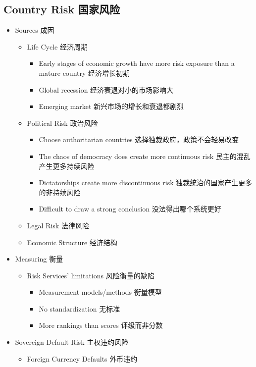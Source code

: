 \documentclass[a4paper,6pt,twoside,openany]{article}
\begin{document}
\subsection{Country Risk 国家风险}
\begin{itemize}
\item Sources 成因
  \begin{itemize}
  \item Life Cycle 经济周期
    \begin{itemize}
    \item Early stages of economic growth have more risk exposure than a mature country 经济增长初期
    \item Global recession 经济衰退对小的市场影响大
    \item Emerging market 新兴市场的增长和衰退都剧烈
    \end{itemize}
  \item Political Risk 政治风险
    \begin{itemize}
    \item Choose authoritarian countries 选择独裁政府，政策不会轻易改变
    \item The chaos of democracy does create more continuous risk 民主的混乱产生更多持续风险
    \item Dictatorships create more discontinuous risk 独裁统治的国家产生更多的非持续风险
      \item Difficult to draw a strong conclusion 没法得出哪个系统更好
    \end{itemize}
  \item Legal Risk 法律风险
  \item Economic Structure 经济结构
  \end{itemize}
\item Measuring 衡量
  \begin{itemize}
  \item Risk Services' limitations 风险衡量的缺陷
    \begin{itemize}
    \item Measurement models/methods 衡量模型
    \item No standardization 无标准
    \item More rankings than scores 评级而非分数
    \end{itemize}
  \end{itemize}
\item Sovereign Default Risk 主权违约风险
  \begin{itemize}
  \item Foreign Currency Defaults 外币违约

\end{itemize}
\end{itemize}
\end{document}
